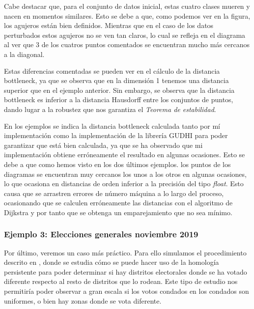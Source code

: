 Cabe destacar que, para el conjunto de datos inicial, estas cuatro clases mueren y nacen en momentos similares. Esto se debe a que, como podemos ver en la figura, los agujeros están bien definidos. Mientras que en el caso de los datos perturbados estos agujeros no se ven tan claros, lo cual se refleja en el diagrama al ver que 3 de los cuatros puntos comentados se encuentran mucho más cercanos a la diagonal.

Estas diferencias comentadas se pueden ver en el cálculo de la distancia bottleneck, ya que se observa que en la dimensión 1 tenemos una distancia superior que en el ejemplo anterior. Sin embargo, se observa que la distancia bottleneck es inferior a la distancia Hausdorff entre los conjuntos de puntos, dando lugar a la robustez que nos garantiza el \emph{Teorema de estabilidad}.


\begin{remark}
En los ejemplos se indica la distancia bottleneck calculada tanto por mí implementación como la implementación de la librería GUDHI \cite{gudhi:BottleneckDistance} para poder garantizar que está bien calculada, ya que se ha observado que mi implementación obtiene erróneamente el resultado en algunas ocasiones. Esto se debe a que como hemos visto en los dos últimos ejemplos. los puntos de los diagramas se encuentran muy cercanos los unos a los otros en algunas ocasiones, lo que ocasiona en distancias de orden inferior a la precisión del tipo \textit{float}. Esto causa que se arrastren errores de número máquina a lo largo del proceso, ocasionando que se calculen erróneamente las distancias con el algoritmo de Dijkstra y por tanto que se obtenga un emparejamiento que no sea mínimo. 
\end{remark}

\subsubsection{Ejemplo 3: Elecciones generales noviembre 2019}
Por último, veremos un caso más práctico. Para ello simulamos el procedimiento descrito en \cite{votosArticulo}, donde se estudia cómo se puede hacer uso de la homología persistente para poder determinar si hay distritos electorales donde se ha votado diferente respecto al resto de distritos que lo rodean. Este tipo de estudio nos permitiría poder observar a gran escala si los votos condados en los condados son uniformes, o bien hay zonas donde se vota diferente.

